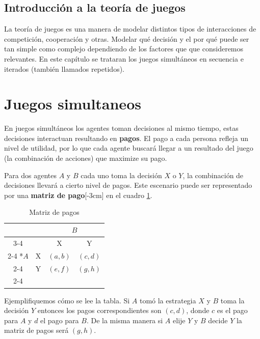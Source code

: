 \subsection*{Introducción a la teoría de juegos}
La teoría de juegos es una manera de modelar distintos tipos de interacciones de competición, cooperación y otras. Modelar qué decisión y el por qué puede ser tan simple como complejo dependiendo de los factores que que consideremos relevantes. En este capítulo se trataran los juegos simultáneos en secuencia e iterados (también llamados repetidos). 

\section{Juegos simultaneos}

En juegos simultáneos los agentes toman decisiones al mismo tiempo, estas decisiones interactuan resultando en \textbf{pagos}. El pago a cada persona refleja un nivel de utilidad, por lo que cada agente buscará llegar a un resultado del juego (la combinación de acciones) que maximize su pago. 

Para dos agentes $A$ y $B$ cada uno toma la decisión $X$ o $Y$, la combinación de decisiones llevará a cierto nivel de pagos. Este escenario puede ser representado por una \textbf{matriz de pago}[-3cm] en el cuadro \ref{cuadro: matriz de pago genérica}.

\begin{table}[!htbp]
  
  \centering
  \caption{Matriz de pagos}
  \setlength{\extrarowheight}{2pt}
  \label{cuadro: matriz de pago genérica}
  \begin{tabular}{*{4}{c|}}
    \multicolumn{2}{c}{} & \multicolumn{2}{c}{$B$}\\\cline{3-4}
    \multicolumn{1}{c}{} &  & X  & Y \\\cline{2-4}
    \multirow{2}*{$A$}  & X & $(a,b)$ & $(c,d)$ \\\cline{2-4}
    & Y & $(e,f)$ & $(g,h)$ \\\cline{2-4} 
  \end{tabular}
\end{table}

Ejemplifiquemos cómo se lee la tabla. Si $A$ tomó la estrategia $X$ y $B$ toma la decisión $Y$ entonces los pagos correspondientes son $(c,d)$, donde $c$ es el pago para $A$ y $d$ el pago para $B$. De la misma manera si $A$ elije $Y$ y $B$ decide $Y$ la matriz de pagos será $(g,h)$. 

